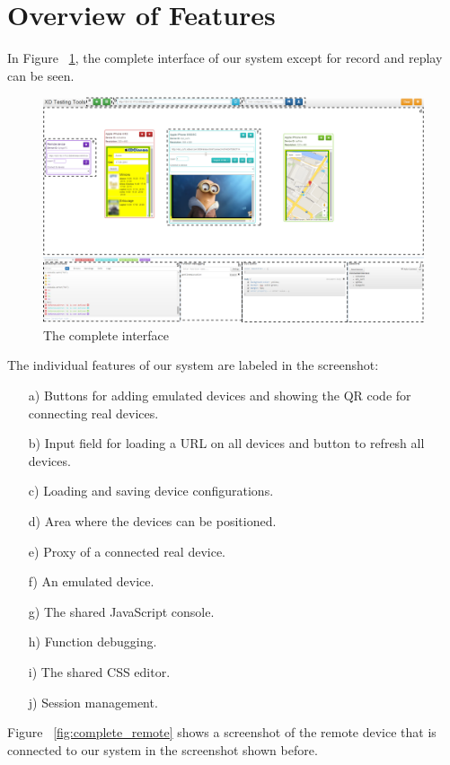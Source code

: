 \section{Overview of Features}

In Figure ~\ref{fig:complete}, the complete interface of our system except for record and replay can be seen.

\begin{figure}[H]
  \centering
    \includegraphics[width=1.0\textwidth]{images/screenshots/complete_labeled.png}
	\caption{The complete interface}
	\label{fig:complete}
\end{figure}

The individual features of our system are labeled in the screenshot:
\begin{itemize}
	\item [a)] Buttons for adding emulated devices and showing the QR code for connecting real devices.
	\item [b)] Input field for loading a URL on all devices and button to refresh all devices.
	\item [c)] Loading and saving device configurations.
	\item [d)] Area where the devices can be positioned.
	\item [e)] Proxy of a connected real device.
	\item [f)] An emulated device.
	\item [g)] The shared JavaScript console.
	\item [h)] Function debugging.
	\item [i)] The shared CSS editor.
	\item [j)] Session management.
\end{itemize}

Figure ~\ref{fig:complete_remote} shows a screenshot of the remote device that is connected to our system in the screenshot shown before.

